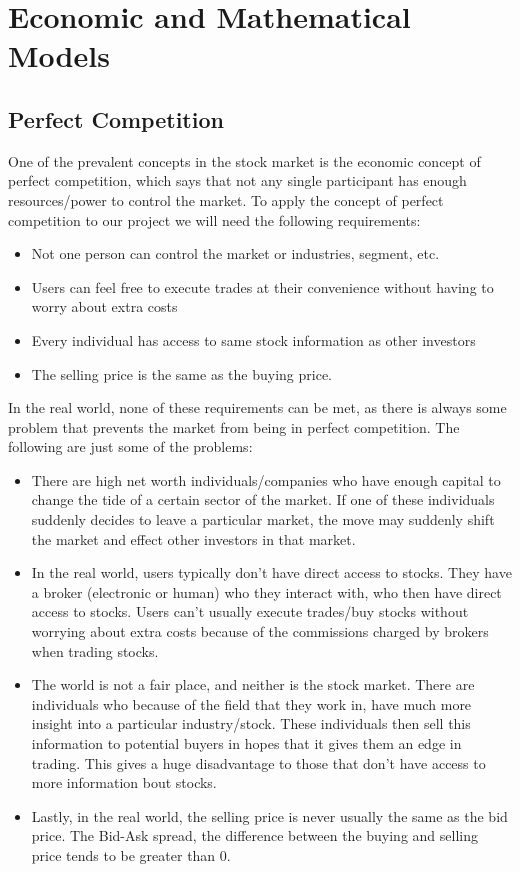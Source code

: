 \section{Economic and Mathematical Models}
\label{econmodels}
\subsection{Perfect Competition}

One of the prevalent concepts in the stock market is the economic concept of perfect
competition, which says that not any single participant has enough resources/power
to control the market.  To apply the concept of perfect competition to our project
we will need the following requirements:

\begin{itemize}
\item
Not one person can control the market or industries, segment, etc.
\item
Users can feel free to execute trades at their convenience without having to worry
about extra costs
\item
Every individual has access to same stock information as other investors
\item
The selling price is the same as the buying price.
\end{itemize}


In the real world, none of these requirements can be met, as there is always some
problem that prevents the market from being in perfect competition.  The following
are just some of the problems:

\begin{itemize}
\item
There are high net worth individuals/companies who have enough capital to change the
tide of a certain sector of the market.  If one of these individuals suddenly decides
to leave a particular market, the move may suddenly shift the market and effect other
investors in that market.
\item
In the real world, users typically don’t have direct access to stocks. They have a
broker (electronic or human) who they interact with, who then have direct access
to stocks.  Users can’t usually execute trades/buy stocks without worrying
about extra costs because of the commissions charged by brokers when trading
stocks.
\item
The world is not a fair place, and neither is the stock market. There are individuals
who because of the field that they work in, have much more insight into a particular
industry/stock.  These individuals then sell this information to potential buyers in
hopes that it gives them an edge in trading. This gives a huge disadvantage to those
that don’t have access to more information bout stocks.
\item
Lastly, in the real world, the selling price is never usually the same as the bid
price.  The Bid-Ask spread, the difference between the buying and selling price
tends to be greater than 0.
\end{itemize}

